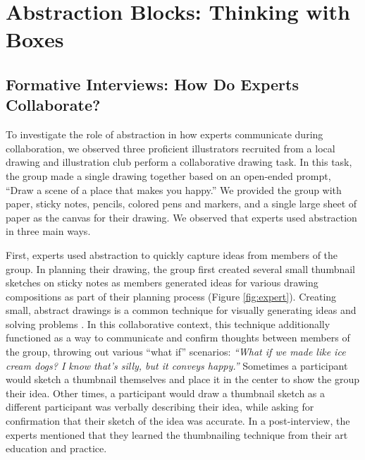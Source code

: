 \section{Abstraction Blocks: Thinking with Boxes}

\subsection{Formative Interviews: How Do Experts Collaborate?}
To investigate the role of abstraction in how experts communicate during collaboration, we observed three proficient illustrators recruited from a local drawing and illustration club perform a collaborative drawing task. In this task, the group made a single drawing together based on an open-ended prompt, ``Draw a scene of a place that makes you happy.'' We provided the group with paper, sticky notes, pencils, colored pens and markers, and a single large sheet of paper as the canvas for their drawing. We observed that experts used abstraction in three main ways.

First, experts used abstraction to quickly capture ideas from members of the group. In planning their drawing, the group first created several small thumbnail sketches on sticky notes as members generated ideas for various drawing compositions as part of their planning process (Figure \ref{fig:expert}). Creating small, abstract drawings is a common technique for visually generating ideas and solving problems \cite{poore1967composition,Poore1967}. In this collaborative context, this technique additionally functioned as a way to communicate and confirm thoughts between members of the group, throwing out various ``what if'' scenarios: \textit{``What if we made like ice cream dogs? I know that's silly, but it conveys happy.''} Sometimes a participant would sketch a thumbnail themselves and place it in the center to show the group their idea. Other times, a participant would draw a thumbnail sketch as a different participant was verbally describing their idea, while asking for confirmation that their sketch of the idea was accurate. In a post-interview, the experts mentioned that they learned the thumbnailing technique from their art education and practice.

